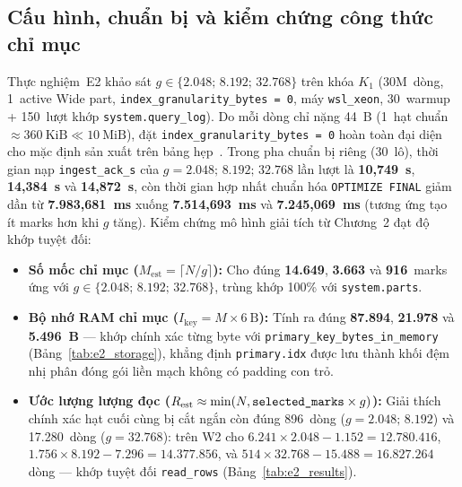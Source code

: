 \documentclass[13pt,a4paper]{report}
\begin{document}
\subsection{Cấu hình, chuẩn bị và kiểm chứng công thức chỉ mục}
Thực nghiệm~E2 khảo sát $g \in \{2.048;\, 8.192;\, 32.768\}$ trên khóa $K_1$ (30M~dòng, 1~active Wide part, \texttt{index\_\allowbreak{}granularity\_\allowbreak{}bytes = 0}, máy \texttt{wsl\_\allowbreak{}xeon}, 30~warmup + 150~lượt khớp \texttt{system.\allowbreak{}query\_\allowbreak{}log}). Do mỗi dòng chỉ nặng 44~B (1~hạt chuẩn $\approx 360~\text{KiB} \ll 10~\text{MiB}$), đặt \texttt{index\_\allowbreak{}granularity\_\allowbreak{}bytes = 0} hoàn toàn đại diện cho mặc định sản xuất trên bảng hẹp~\cite{S2}. Trong pha chuẩn bị riêng (30~lô), thời gian nạp \texttt{ingest\_\allowbreak{}ack\_\allowbreak{}s} của $g = 2.048;\, 8.192;\, 32.768$ lần lượt là \textbf{10,749~s}, \textbf{14,384~s} và \textbf{14,872~s}, còn thời gian hợp nhất chuẩn hóa \texttt{OPTIMIZE FINAL} giảm dần từ \textbf{7.983,681~ms} xuống \textbf{7.514,693~ms} và \textbf{7.245,069~ms} (tương ứng tạo ít marks hơn khi $g$ tăng). Kiểm chứng mô hình giải tích từ Chương~2 đạt độ khớp tuyệt đối:
\begin{itemize}
    \setlength{\itemsep}{2pt}\setlength{\parskip}{0pt}
    \item \textbf{Số mốc chỉ mục ($M_{\text{est}} = \lceil N/g \rceil$):} Cho đúng \textbf{14.649}, \textbf{3.663} và \textbf{916}~marks ứng với $g \in \{2.048;\, 8.192;\, 32.768\}$, trùng khớp 100\% với \texttt{system.\allowbreak{}parts}.
    \item \textbf{Bộ nhớ RAM chỉ mục ($I_{\text{key}} = M \times 6~\text{B}$):} Tính ra đúng \textbf{87.894}, \textbf{21.978} và \textbf{5.496~B} --- khớp chính xác từng byte với \texttt{primary\_\allowbreak{}key\_\allowbreak{}bytes\_\allowbreak{}in\_\allowbreak{}memory} (Bảng~\ref{tab:e2_storage}), khẳng định \texttt{primary.idx} được lưu thành khối đệm nhị phân đóng gói liền mạch không có padding con trỏ.
    \item \textbf{Ước lượng lượng đọc ($R_{\text{est}} \approx \min(N, \texttt{selected\_\allowbreak{}marks} \times g)$):} Giải thích chính xác hạt cuối cùng bị cắt ngắn còn đúng 896~dòng ($g = 2.048;\, 8.192$) và 17.280~dòng ($g = 32.768$): trên W2 cho $6.241 \times 2.048 - 1.152 = 12.780.416$, $1.756 \times 8.192 - 7.296 = 14.377.856$, và $514 \times 32.768 - 15.488 = 16.827.264$ dòng --- khớp tuyệt đối \texttt{read\_\allowbreak{}rows} (Bảng~\ref{tab:e2_results}).
\end{itemize}
\end{document}
